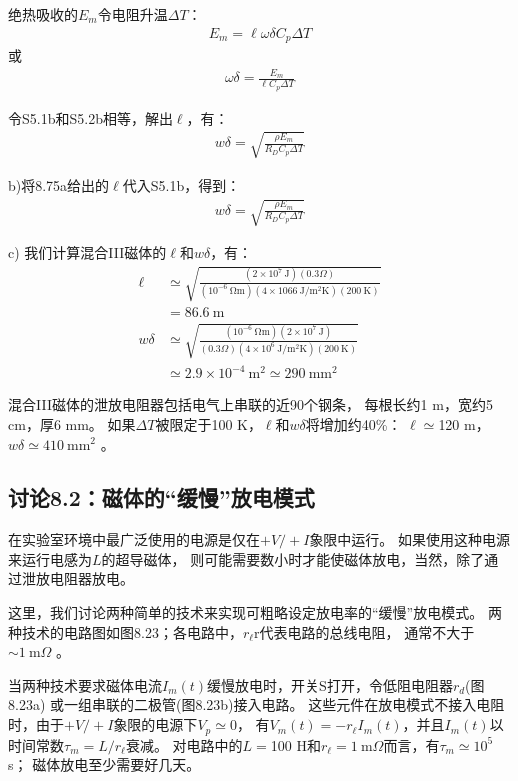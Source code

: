 绝热吸收的$E_m$令电阻升温$\Delta T$：
\begin{align*}%
E_m=\ell\omega\delta C_p\Delta T \tag{S5.2a}
\end{align*}
或
\begin{align*}%
\omega\delta=\frac{E_m}{\ell C_p\Delta T} \tag{S5.2b}
\end{align*}

令S5.1b和S5.2b相等，解出$\ell$，有：
\begin{align*}%
w\delta=\sqrt{\frac{\rho E_m}{R_DC_p\Delta T}} \tag{8.75}
\end{align*}

b)将8.75a给出的$\ell$代入S5.1b，得到：
\begin{align*}
w\delta=\sqrt{\frac{\rho E_m}{R_D C_p \Delta T}} \tag{8.75b}
\end{align*}

c) 我们计算混合III磁体的$\ell$和$w\delta$，有：
\begin{align*}
\ell&\simeq\sqrt{\frac{(2\times 10^7\ \mathrm{J})(0.3\Omega)}{(10^{-6}\ \mathrm{\Omega m})(4\times 1066\ \mathrm{J/m^2K})(200\ \mathrm{K})}} \\
&=86.6\ \mathrm{m}\\
w\delta&\simeq\sqrt{\frac{(10^{-6}\ \mathrm{\Omega m})(2\times 10^7\ \mathrm{J})}{(0.3\Omega)(4\times 10^6\ \mathrm{J/m^2K})(200\ \mathrm{K})}} \\
&\simeq 2.9\times 10^{-4}\ \mathrm{m^2}\simeq 290\ \mathrm{mm^2}
\end{align*}

混合III磁体的泄放电阻器包括电气上串联的近90个钢条，
每根长约1 m，宽约5 cm，厚6 mm。
如果$\Delta T$被限定于100 K，$\ell$和$w\delta$将增加约40\%：
$\ell\simeq$120 m，$w\delta\simeq 410\ \mathrm{mm^2}$ 。


\subsection{讨论8.2：磁体的“缓慢”放电模式}
在实验室环境中最广泛使用的电源是仅在$+V/+I$象限中运行。
如果使用这种电源来运行电感为$L$的超导磁体，
则可能需要数小时才能使磁体放电，当然，除了通过泄放电阻器放电。

这里，我们讨论两种简单的技术来实现可粗略设定放电率的“缓慢”放电模式。
两种技术的电路图如图8.23；各电路中，$r_\ell$r代表电路的总线电阻，
通常不大于$\sim 1\ \mathrm{m}\Omega$ 。

当两种技术要求磁体电流$I_m(t)$缓慢放电时，开关S打开，令低阻电阻器$r_d$(图8.23a)
或一组串联的二极管(图8.23b)接入电路。
这些元件在放电模式不接入电阻时，由于$+V/+I$象限的电源下$V_p\simeq 0$，
有$V_m(t)=-r_\ell I_m(t)$，并且$I_m(t)$以时间常数$\tau_m=L/r_\ell$衰减。
对电路中的$L=$100 H和$r_\ell=1\ \mathrm{m}\Omega$而言，有$\tau_m\simeq 10^5$ s；
磁体放电至少需要好几天。

